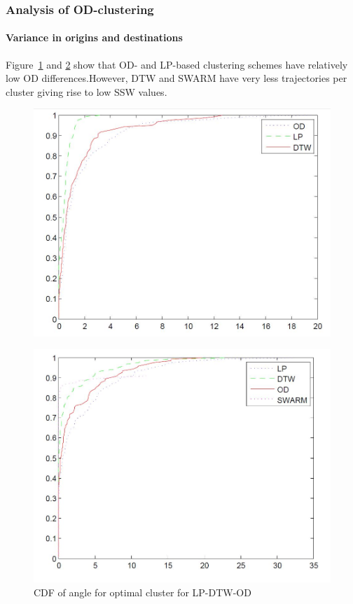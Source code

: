 \subsubsection{Analysis of OD-clustering}

\paragraph{Variance in origins and destinations}
Figure~\ref{fig:od_cdf} and \ref{fig:angle_cdf} show that OD- and LP-based clustering schemes have relatively low OD differences.However, DTW and SWARM have very less trajectories per cluster giving rise to low SSW values.  

\begin{figure}
\centering     
\includegraphics[scale=0.3]{figs/od_cdf.jpg}
\caption{}
\label{fig:od_cdf}  
\end{figure} 

\begin{figure}[H]
\centering     
\includegraphics[scale=0.3]{figs/angle_cdf.jpg}
\caption{CDF of angle for optimal cluster for LP-DTW-OD}
\label{fig:angle_cdf}  
\end{figure} 

